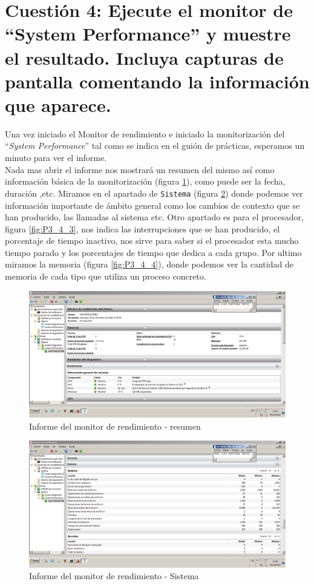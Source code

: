 \section{Cuestión 4: Ejecute el monitor de “System Performance” y muestre el resultado. Incluya capturas de pantalla comentando la información que aparece.}
Una vez iniciado el Monitor de rendimiento e iniciado la monitorización del ``\textit{System Performance}''
tal como se indica en el guión de prácticas, esperamos un minuto para ver el informe.\\
Nada mas abrir el informe nos mostrará un resumen del mismo así como información básica de la
monitorización (figura \ref{fig:P3_4_1}), como puede ser la fecha, duración ,etc. Miramos en el apartado
de \texttt{Sistema} (figura \ref{fig:P3_4_2}) donde podemos ver información importante de ámbito general
como los cambios de contexto que se han producido, las llamadas al sistema etc.
Otro apartado es para el procesador, figura \ref{fig:P3_4_3}, nos indica las interrupciones que se han producido,
el porcentaje de tiempo inactivo, nos sirve para saber si el procesador esta mucho tiempo parado y los 
porcentajes de tiempo que dedica a cada grupo.
Por ultimo miramos la memoria (figura \ref{fig:P3_4_4}), donde podemos ver la cantidad de 
memoria de cada tipo que utiliza un proceso concreto.

\begin{figure}[H] %
\centering
\includegraphics[scale=0.4]{./imagenes/P3_4_1.png} 
\caption{Informe del monitor de rendimiento - resumen} \label{fig:P3_4_1}
\end{figure}

\begin{figure}[H] %
\centering
\includegraphics[scale=0.4]{./imagenes/P3_4_2.png} 
\caption{Informe del monitor de rendimiento - Sistema} \label{fig:P3_4_2}
\end{figure}

